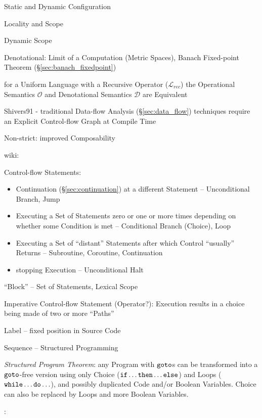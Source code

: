 Static and Dynamic Configuration

Locality and Scope

Dynamic Scope

Denotational: Limit of a Computation (Metric Spaces), Banach
Fixed-point Theorem (\S\ref{sec:banach_fixedpoint}) %

for a Uniform Language with a Recursive Operator ($\mathcal{L}_{rec}$)
the Operational Semantics $\mathcal{O}$ and Denotational Semantics
$\mathcal{D}$ are Equivalent


\asterism


Shivers91 - traditional Data-flow Analysis (\S\ref{sec:data_flow})
techniques require an Explicit Control-flow Graph at Compile Time

Non-strict: improved Composability %


wiki:

Control-flow Statements:
\begin{itemize}
  \item Continuation (\S\ref{sec:continuation}) at a different
    Statement -- Unconditional Branch, Jump
  \item Executing a Set of Statements zero or one or more times
    depending on whether some Condition is met -- Conditional Branch
    (Choice), Loop
  \item Executing a Set of ``distant'' Statements after which Control
    ``usually'' Returns -- Subroutine, Coroutine, Continuation
  \item stopping Execution -- Unconditional Halt
\end{itemize}

``Block'' -- Set of Statements, Lexical Scope %

Imperative Control-flow Statement (Operator?): Execution results in a
choice being made of two or more ``Paths''

Label -- fixed position in Source Code

Sequence -- Structured Programming

\emph{Structured Program Theorem}: any Program with $\mathtt{goto}$s can
be transformed into a $\mathtt{goto}$-free version using only Choice
($\mathtt{if}\ldots\mathtt{then}\ldots\mathtt{else}$) and Loops
($\mathtt{while}\ldots\mathtt{do}\ldots$), and possibly duplicated Code
and/or Boolean Variables. Choice can also be replaced by Loops and
more Boolean Variables.


\asterism


\cite{selinger01}:


